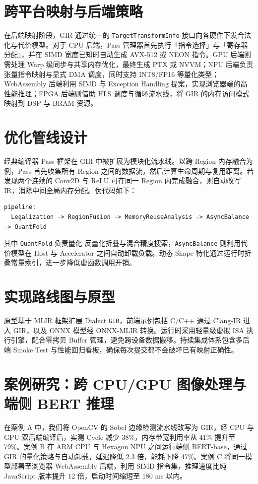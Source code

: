 \chapter{跨平台映射与后端策略}
在后端映射阶段，GIR 通过统一的 \texttt{TargetTransformInfo} 接口向各硬件下发合法化与代价模型。对于 CPU 后端，Pass 管理器首先执行「指令选择」与「寄存器分配」，并在 SIMD 宽度已知时自动生成 AVX-512 或 NEON 指令。GPU 后端则需处理 Warp 级同步与共享内存优化，最终生成 PTX 或 NVVM；NPU 后端负责张量指令映射与显式 DMA 调度，同时支持 INT8/FP16 等量化类型；WebAssembly 后端利用 SIMD 与 Exception Handling 提案，实现浏览器端的高性能推理；FPGA 后端则借助 HLS 调度与循环流水线，将 GIR 的内存访问模式映射到 DSP 与 BRAM 资源。\par
\chapter{优化管线设计}
经典编译器 Pass 框架在 GIR 中被扩展为模块化流水线。以跨 Region 内存融合为例，Pass 首先收集所有 Region 之间的数据流，然后计算生命周期与复用距离。若发现两个连续的 Conv2D 与 ReLU 可在同一 Region 内完成融合，则自动改写 IR，消除中间全局内存分配。伪代码如下：\par
\begin{lstlisting}
pipeline:
  Legalization -> RegionFusion -> MemoryReuseAnalysis -> AsyncBalance -> QuantFold
\end{lstlisting}
其中 \texttt{QuantFold} 负责量化-反量化折叠与混合精度搜索，\texttt{AsyncBalance} 则利用代价模型在 Host 与 Accelerator 之间自动卸载负载。动态 Shape 特化通过运行时折叠常量索引，进一步降低虚函数调用开销。\par
\chapter{实现路线图与原型}
原型基于 MLIR 框架扩展 Dialect \texttt{GIR}，前端示例包括 C/C++ 通过 Clang-IR 进入 GIR，以及 ONNX 模型经 ONNX-MLIR 转换。运行时采用轻量级虚拟 ISA 执行引擎，配合零拷贝 Buffer 管理，避免跨设备数据搬移。持续集成体系包含多后端 Smoke Test 与性能回归看板，确保每次提交都不会破坏已有映射正确性。\par
\chapter{案例研究：跨 CPU/GPU 图像处理与端侧 BERT 推理}
在案例 A 中，我们将 OpenCV 的 Sobel 边缘检测流水线改写为 GIR，经 CPU 与 GPU 双后端编译后，实测 Cycle 减少 38\%{}，内存带宽利用率从 41\%{} 提升至 79\%{}。案例 B 在 ARM CPU 与 Hexagon NPU 之间运行端侧 BERT-base，通过 GIR 的量化策略与自动卸载，延迟降低 2.3 倍，能耗下降 47\%{}。案例 C 将同一模型部署至浏览器 WebAssembly 后端，利用 SIMD 指令集，推理速度比纯 JavaScript 版本提升 12 倍，启动时间缩短至 180 ms 以内。\par
